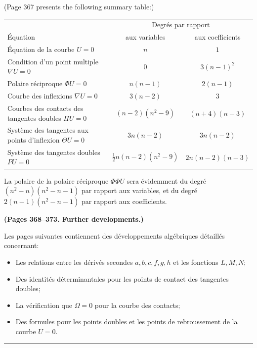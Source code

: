 \documentclass[11pt,a4paper]{article}
\theoremstyle{plain}
\theoremstyle{definition}
\begin{document}
(Page 367 presents the following summary table:)

\begin{center}
\begin{tabular}{lcc}
\hline
 & \multicolumn{2}{c}{Degr\'{e}s par rapport} \\

\'{E}quation & aux variables & aux coefficients \\

\'{E}quation de la courbe $U = 0$ & $n$ & $1$ \\
Condition d'un point multiple $\nabla U = 0$ & $0$ & $3(n-1)^2$ \\
Polaire r\'{e}ciproque $\Phi U = 0$ & $n(n-1)$ & $2(n-1)$ \\
Courbe des inflexions $\nabla U = 0$ & $3(n-2)$ & $3$ \\
Courbes des contacts des tangentes doubles $\Pi U = 0$ & $(n-2)(n^2-9)$ & $(n+4)(n-3)$ \\
Syst\`{e}me des tangentes aux points d'inflexion $\Theta U = 0$ & $3n(n-2)$ & $3n(n-2)$ \\
Syst\`{e}me des tangentes doubles $PU = 0$ & $\tfrac{1}{2}n(n-2)(n^2-9)$ & $2n(n-2)(n-3)$ \\
\hline
\end{tabular}
\end{center}

La polaire de la polaire r\'{e}ciproque $\Phi\Phi U$ sera \'{e}videmment du degr\'{e}
$(n^2-n)(n^2-n-1)$ par rapport aux variables, et du degr\'{e} $2(n-1)(n^2-n-1)$
par rapport aux coefficients.

\bigskip

\textbf{(Pages 368--373. Further developments.)}

Les pages suivantes contiennent des d\'{e}veloppements alg\'{e}briques d\'{e}taill\'{e}s concernant:
\begin{itemize}
\item Les relations entre les d\'{e}riv\'{e}s secondes $a,b,c,f,g,h$ et les fonctions $L,M,N$;
\item Des identit\'{e}s d\'{e}terminantales pour les points de contact des tangentes doubles;
\item La v\'{e}rification que $\Omega = 0$ pour la courbe des contacts;
\item Des formules pour les points doubles et les points de rebroussement de la courbe $U=0$.
\end{itemize}

\bigskip
\hrule
\bigskip
\end{document}
